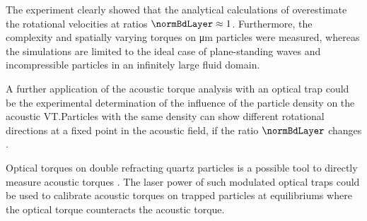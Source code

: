 The experiment clearly showed that the analytical calculations of 
\citeauthor{lamprecht2015,Busse, Rudnick, Wang} \cite{lamprecht2015, Busse, 
Rudnick, Wang}  overestimate the rotational velocities at ratios $\normBdLayer 
\approx 1$. Furthermore, the complexity and spatially varying torques on 
\si{\micro\meter} particles were measured, whereas the simulations are limited 
to the ideal case of plane-standing waves and incompressible particles in an 
infinitely large fluid domain. 

A further application of the acoustic torque analysis with an optical trap could 
be the experimental determination of the influence of the particle density on 
the acoustic VT.\@ Particles with the same density can show different rotational 
directions at a fixed point in the acoustic field, if the ratio $\normBdLayer$ 
changes \cite{hahn2016}.

Optical torques on double refracting quartz particles is a possible tool to 
directly measure acoustic torques \cite{la2004}. The laser power of such 
modulated optical traps could be used to calibrate acoustic torques on trapped 
particles at equilibriums where the optical torque counteracts the acoustic 
torque. 


